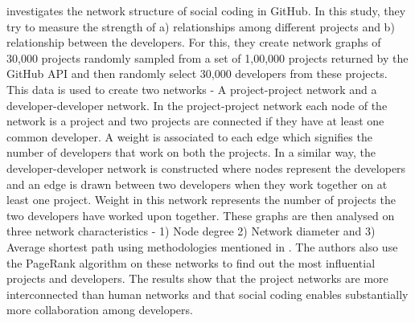 \cite{Thung2013} investigates the network structure of social coding in GitHub. In this study, they try to measure the strength of a) relationships among different projects and b) relationship between the developers. For this, they create network graphs of 30,000 projects randomly sampled from a set of 1,00,000 projects returned by the GitHub API and then randomly select 30,000 developers from these projects. This data is used to create two networks - A project-project network and a developer-developer network. In the project-project network each node of the network is a project and two projects are connected if they have at least one common developer. A weight is associated to each edge which signifies the number of developers that work on both the projects. In a similar way, the developer-developer network is constructed where nodes represent the developers and an edge is drawn between two developers when they work together on at least one project. Weight in this network represents the number of projects the two developers have worked upon together. These graphs are then analysed on three network characteristics - 1) Node degree 2) Network diameter and 3) Average shortest path using methodologies mentioned in \cite{Surian2010}. The authors also use the PageRank algorithm on these networks to find out the most influential projects and developers. The results show that the project networks are more interconnected than human networks and that social coding enables substantially more collaboration among developers.

